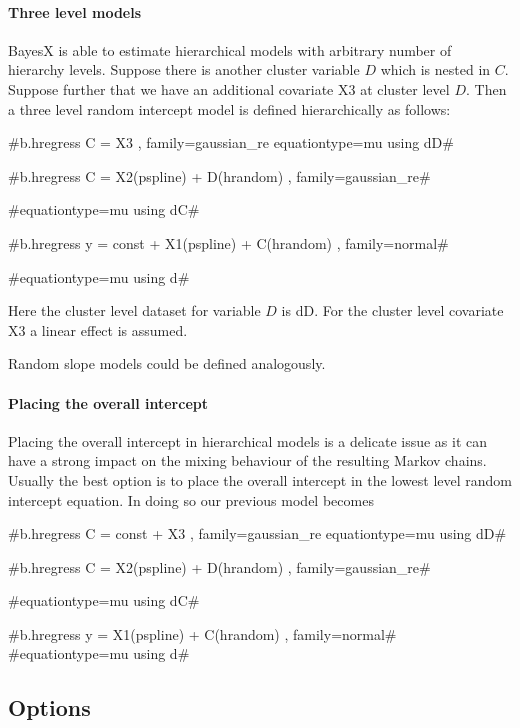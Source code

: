 \paragraph{Three level models}

$ $ \\

BayesX is able to estimate hierarchical models with arbitrary number of hierarchy levels. Suppose there is another cluster variable
$D$ which is nested in $C$. Suppose further that we have an additional covariate X3 at cluster level $D$. Then a three level random intercept
model is defined hierarchically as follows:

#b.hregress C = X3   , family=gaussian_re equationtype=mu using dD#

#b.hregress C = X2(pspline) + D(hrandom)  , family=gaussian_re#

#equationtype=mu using dC#

#b.hregress y = const + X1(pspline)  + C(hrandom) , family=normal#

#equationtype=mu using d#

Here the cluster level dataset for variable $D$ is dD. For the cluster level covariate X3 a linear effect is assumed.

Random slope models could be defined analogously.

\paragraph{Placing the overall intercept}

$ $ \\

Placing the overall intercept in hierarchical models is a delicate issue as it can have a strong impact on the
mixing behaviour of the resulting Markov chains.
Usually the best option is to place the overall intercept in the lowest level random intercept equation. In doing so our
previous model becomes

#b.hregress C = const + X3   , family=gaussian_re equationtype=mu using dD#

#b.hregress C = X2(pspline) + D(hrandom)  , family=gaussian_re#

#equationtype=mu using dC#

#b.hregress y = X1(pspline)  + C(hrandom) , family=normal#
#equationtype=mu using d#



\subsection{Options}
\label{mcmcregregressoptions}

